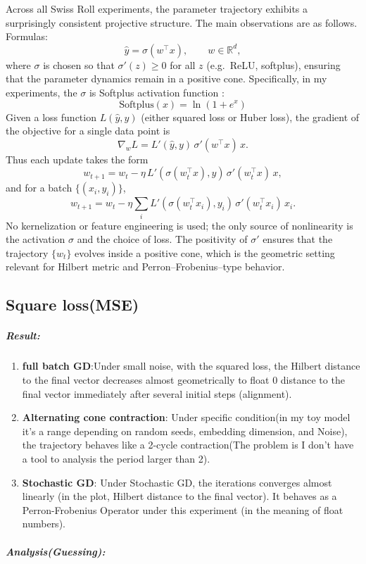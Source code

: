 \documentclass[11pt]{article}
\begin{document}
Across all Swiss Roll experiments, the parameter trajectory exhibits a
surprisingly consistent projective structure.  The main observations are
as follows.
Formulas:
\[
\hat{y} = \sigma(w^\top x),
\qquad w \in \mathbb{R}^d,
\]
where $\sigma$ is chosen so that $\sigma'(z)\ge 0$ for all $z$
(e.g.\ ReLU, softplus), ensuring that the parameter dynamics remain in a
positive cone.
Specifically, in my experiments, the $\sigma$ is Softplus activation function : \[
\text{Softplus}(x) = \ln\left(1 + e^x\right)
\]
Given a loss function $L(\hat{y}, y)$ (either squared loss or Huber
loss), the gradient of the objective for a single data point is
\[
\nabla_w L = L'(\hat{y},y)\,\sigma'(w^\top x)\,x.
\]
Thus each update takes the form
\[
w_{t+1}
= w_t - \eta\, L'(\sigma(w_t^\top x), y)\,\sigma'(w_t^\top x)\,x,
\]
and for a batch $\{(x_i,y_i)\}$,
\[
w_{t+1}= w_t - \eta \sum_i
L'(\sigma(w_t^\top x_i), y_i)\,\sigma'(w_t^\top x_i)\,x_i.
\]
No kernelization or feature engineering is used; the only source of
nonlinearity is the activation $\sigma$ and the choice of loss.  The
positivity of $\sigma'$ ensures that the trajectory $\{w_t\}$ evolves
inside a positive cone, which is the geometric setting relevant for
Hilbert metric and Perron--Frobenius--type behavior.

\subsection{Square loss(MSE)}
\subparagraph{\textbf{Result}:}
\begin{enumerate}
    \item \textbf{full batch GD}:Under small noise, with the squared loss, the Hilbert distance to the final vector decreases almost geometrically to float 0 distance to the final vector immediately after several initial steps (alignment).
    \item \textbf{Alternating cone contraction}: Under specific condition(in my toy model it's a range depending on random seeds, embedding dimension, and Noise), the trajectory behaves like a 2-cycle contraction(The problem is I don't have a tool to analysis the period larger than 2).
    \item \textbf{Stochastic GD}: Under Stochastic GD, the iterations converges almost linearly (in the plot, Hilbert distance to the final vector). It behaves as a Perron-Frobenius Operator under this experiment (in the meaning of float numbers).
\end{enumerate}

\subparagraph{\textbf{Analysis(Guessing):}}
\end{document}
